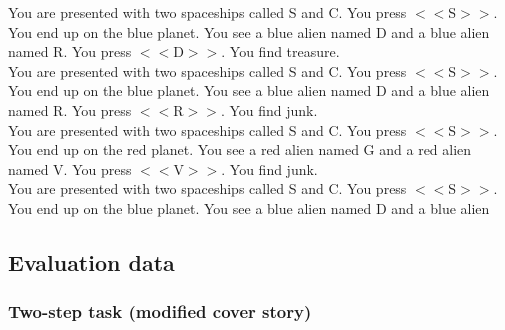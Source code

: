 \documentclass[pdflatex,sn-nature]{sn-jnl}%
\theoremstyle{thmstyleone}%
\theoremstyle{thmstyletwo}%
\theoremstyle{thmstylethree}%
\begin{document}
You are presented with two spaceships called S and C. You press $<<$S$>>$. You end up on the blue planet. You see a blue alien named D and a blue alien named R. You press $<<$D$>>$. You find treasure. $~$\\ 
You are presented with two spaceships called S and C. You press $<<$S$>>$. You end up on the blue planet. You see a blue alien named D and a blue alien named R. You press $<<$R$>>$. You find junk. $~$\\ 
You are presented with two spaceships called S and C. You press $<<$S$>>$. You end up on the red planet. You see a red alien named G and a red alien named V. You press $<<$V$>>$. You find junk. $~$\\ 
You are presented with two spaceships called S and C. You press $<<$S$>>$. You end up on the blue planet. You see a blue alien named D and a blue alien 

\subsection*{Evaluation data}

\subsubsection*{Two-step task (modified cover story)}
\end{document}
